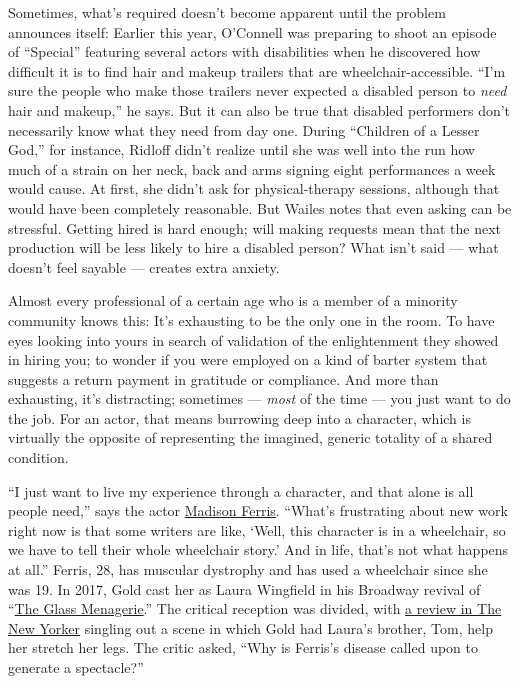 Sometimes, what's required doesn't become apparent until the problem
announces itself: Earlier this year, O'Connell was preparing to shoot an
episode of ``Special'' featuring several actors with disabilities when
he discovered how difficult it is to find hair and makeup trailers that
are wheelchair-accessible. ``I'm sure the people who make those trailers
never expected a disabled person to \emph{need} hair and makeup,'' he
says. But it can also be true that disabled performers don't necessarily
know what they need from day one. During ``Children of a Lesser God,''
for instance, Ridloff didn't realize until she was well into the run how
much of a strain on her neck, back and arms signing eight performances a
week would cause. At first, she didn't ask for physical-therapy
sessions, although that would have been completely reasonable. But
Wailes notes that even asking can be stressful. Getting hired is hard
enough; will making requests mean that the next production will be less
likely to hire a disabled person? What isn't said --- what doesn't feel
sayable --- creates extra anxiety.

Almost every professional of a certain age who is a member of a minority
community knows this: It's exhausting to be the only one in the room. To
have eyes looking into yours in search of validation of the
enlightenment they showed in hiring you; to wonder if you were employed
on a kind of barter system that suggests a return payment in gratitude
or compliance. And more than exhausting, it's distracting; sometimes ---
\emph{most} of the time --- you just want to do the job. For an actor,
that means burrowing deep into a character, which is virtually the
opposite of representing the imagined, generic totality of a shared
condition.

``I just want to live my experience through a character, and that alone
is all people need,'' says the actor
\href{https://www.nytimes3xbfgragh.onion/2017/03/24/theater/a-wheelchair-on-broadway-isnt-exploitation-its-progress.html}{Madison
Ferris}. ``What's frustrating about new work right now is that some
writers are like, `Well, this character is in a wheelchair, so we have
to tell their whole wheelchair story.' And in life, that's not what
happens at all.'' Ferris, 28, has muscular dystrophy and has used a
wheelchair since she was 19. In 2017, Gold cast her as Laura Wingfield
in his Broadway revival of
``\href{https://www.nytimes3xbfgragh.onion/2017/03/09/theater/the-glass-menagerie-review.html?_r=0}{The
Glass Menagerie}.'' The critical reception was divided, with
\href{https://www.newyorker.com/culture/culture-desk/a-cold-and-hip-glass-menagerie}{a
review in The New Yorker} singling out a scene in which Gold had Laura's
brother, Tom, help her stretch her legs. The critic asked, ``Why is
Ferris's disease called upon to generate a spectacle?''

